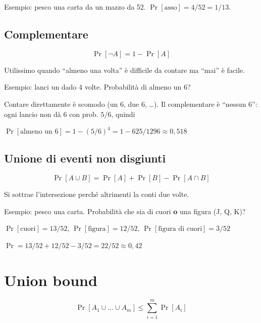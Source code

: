 \begin{esempio}

Esempio: pesco una carta da un mazzo da 52. \(\Pr[\text{asso}] = 4/52 = 1/13\).

\end{esempio}

\subsection{Complementare}

\[
\Pr[\neg A] = 1 - \Pr[A]
\]

Utilissimo quando ``almeno una volta'' è difficile da contare ma ``mai'' è facile.

\begin{esempio}

Esempio: lanci un dado 4 volte. Probabilità di almeno un 6?

Contare direttamente è scomodo (un 6, due 6, \ldots). Il complementare è ``nessun 6'': ogni lancio non dà 6 con prob. \(5/6\), quindi

\(\Pr[\text{almeno un 6}] = 1 - (5/6)^4 = 1 - 625/1296 \approx 0{,}518\)

\end{esempio}

\subsection{Unione di eventi non disgiunti}

\[
\Pr[A \cup B] = \Pr[A] + \Pr[B] - \Pr[A \cap B]
\]

Si sottrae l'intersezione perché altrimenti la conti due volte.

\begin{esempio}

Esempio: pesco una carta. Probabilità che sia di cuori \textbf{o} una figura (J, Q, K)?

\(\Pr[\text{cuori}] = 13/52\), \(\Pr[\text{figura}] = 12/52\), \(\Pr[\text{figura di cuori}] = 3/52\)

\(\Pr = 13/52 + 12/52 - 3/52 = 22/52 \approx 0{,}42\)

\end{esempio}

\section{Union bound}

\[
\Pr[A_1 \cup \dots \cup A_m] \le \sum_{i=1}^{m} \Pr[A_i]
\]

